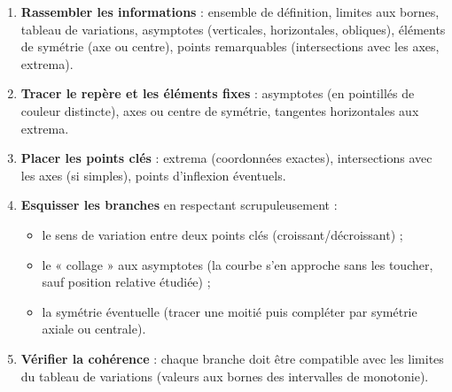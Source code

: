 \documentclass[11pt]{article}
\begin{document}
\begin{methode}
\begin{enumerate}
\item \textbf{Rassembler les informations} : ensemble de définition, limites aux bornes, tableau de variations, asymptotes (verticales, horizontales, obliques), éléments de symétrie (axe ou centre), points remarquables (intersections avec les axes, extrema).
\item \textbf{Tracer le repère et les éléments fixes} : asymptotes (en pointillés de couleur distincte), axes ou centre de symétrie, tangentes horizontales aux extrema.
\item \textbf{Placer les points clés} : extrema (coordonnées exactes), intersections avec les axes (si simples), points d'inflexion éventuels.
\item \textbf{Esquisser les branches} en respectant scrupuleusement :
      \begin{itemize}
      \item le sens de variation entre deux points clés (croissant/décroissant) ;
      \item le « collage » aux asymptotes (la courbe s'en approche sans les toucher, sauf position relative étudiée) ;
      \item la symétrie éventuelle (tracer une moitié puis compléter par symétrie axiale ou centrale).
      \end{itemize}
\item \textbf{Vérifier la cohérence} : chaque branche doit être compatible avec les limites du tableau de variations (valeurs aux bornes des intervalles de monotonie).
\end{enumerate}
\end{methode}
\end{document}
